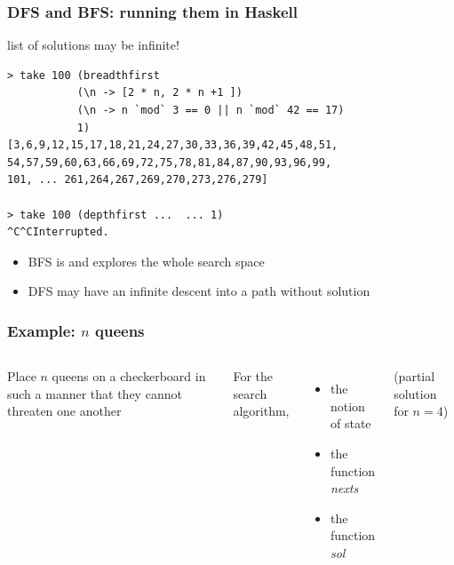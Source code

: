 \begin{frame}[fragile]\frametitle{DFS and BFS: running them in Haskell}

   list of solutions may be infinite!

\begin{lstlisting}
> take 100 (breadthfirst
           (\n -> [2 * n, 2 * n +1 ])
           (\n -> n `mod` 3 == 0 || n `mod` 42 == 17)
           1)
[3,6,9,12,15,17,18,21,24,27,30,33,36,39,42,45,48,51,
54,57,59,60,63,66,69,72,75,78,81,84,87,90,93,96,99,
101, ... 261,264,267,269,270,273,276,279]

> take 100 (depthfirst ...  ... 1)
^C^CInterrupted.
\end{lstlisting}
\begin{itemize}
\item BFS is  and explores the whole search space
\item DFS may have an infinite descent into a path without solution
\end{itemize}

\end{frame}


\begin{frame}[fragile]\frametitle{Example: $n$ queens}

\begin{columns}[t]

 Place $n$ queens on a checkerboard in such a manner that they
cannot threaten one another

\vspace{5mm}
For the search algorithm, 
\begin{itemize}
\item the notion of state
\item the function \emph{nexts}
\item the function \emph{sol}
\end{itemize}


\begin{center}

(partial solution for $n=4$)
\end{center}
\end{columns}

\end{frame}

